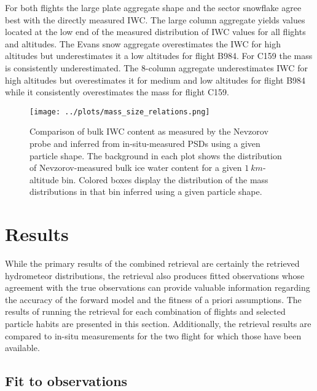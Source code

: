 \documentclass[journal abbreviation, manuscript]{copernicus}
\begin{document}
For both flights the large plate aggregate shape and the sector snowflake agree
best with the directly measured IWC. The large column aggregate yields values
located at the low end of the measured distribution of IWC values for all
flights and altitudes. The Evans snow aggregate overestimates the IWC for high
altitudes but underestimates it a low altitudes for flight B984. For C159 the
mass is consistently underestimated. The 8-column aggregate underestimates IWC
for high altitudes but overestimates it for medium and low altitudes for flight
B984 while it consistently overestimates the mass for flight C159.

\begin{figure}
  \centering
  \texttt{[image: ../plots/mass\_size\_relations.png]}
  \caption{
    Comparison of bulk IWC content as measured by the Nevzorov probe and
    inferred from in-situ-measured PSDs using a given particle shape. The
    background in each plot shows the distribution of Nevzorov-measured bulk
    ice water content for a given $1\ \unit{km}$-altitude bin. Colored boxes
    display the distribution of the mass distributions in that bin inferred
    using a given particle shape.
    }
  \label{fig:mass_size_relation}
\end{figure}


\section{Results}
\label{sec:results}

While the primary results of the combined retrieval are certainly the retrieved
hydrometeor distributions, the retrieval also produces fitted observations whose
agreement with the true observations can provide valuable information regarding
the accuracy of the forward model and the fitness of a priori assumptions. The
results of running the retrieval for each combination of flights and selected
particle habits are presented in this section. Additionally, the retrieval
results are compared to in-situ measurements for the two flight for which those
have been available.


\subsection{Fit to observations}
\end{document}
